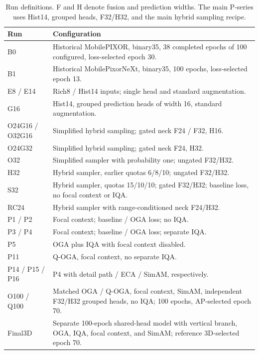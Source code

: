 \documentclass[10pt]{article}
\begin{document}
\begin{table}[htbp]
\centering\small
\caption{Run definitions. F and H denote fusion and prediction widths. The main P-series uses Hist14, grouped heads, F32/H32, and the main hybrid sampling recipe.}
\label{tab:designs}
\begin{tabular}{lp{12.1cm}}
\toprule Run & Configuration \\
\midrule
B0 & Historical MobilePIXOR, binary35, 38 completed epochs of 100 configured, loss-selected epoch 30. \\
B1 & Historical MobilePixorNeXt, binary35, 100 epochs, loss-selected epoch 13. \\
E8 / E14 & Rich8 / Hist14 inputs; single head and standard augmentation. \\
G16 & Hist14, grouped prediction heads of width 16, standard augmentation. \\
O24G16 / O32G16 & Simplified hybrid sampling; gated neck F24 / F32, H16. \\
O24G32 & Simplified hybrid sampling; gated neck F24, H32. \\
O32 & Simplified sampler with probability one; ungated F32/H32. \\
H32 & Hybrid sampler, earlier quotas 6/8/10; ungated F32/H32. \\
S32 & Hybrid sampler, quotas 15/10/10; gated F32/H32; baseline loss, no focal context or IQA. \\
RC24 & Hybrid sampler with range-conditioned neck F24/H32. \\
P1 / P2 & Focal context; baseline / OGA loss; no IQA. \\
P3 / P4 & Focal context; baseline / OGA loss; separate IQA. \\
P5 & OGA plus IQA with focal context disabled. \\
P11 & Q-OGA, focal context, no separate IQA. \\
P14 / P15 / P16 & P4 with detail path / ECA / SimAM, respectively. \\
O100 / Q100 & Matched OGA / Q-OGA, focal context, SimAM, independent F32/H32 grouped heads, no IQA; 100 epochs, AP-selected epoch 70. \\
Final3D & Separate 100-epoch shared-head model with vertical branch, OGA, IQA, focal context, and SimAM; reference 3D-selected epoch 70. \\
\bottomrule
\end{tabular}
\end{table}

\begin{table}[htbp]
\centering\scriptsize\setlength{\tabcolsep}{3pt}
\caption{All 23 local BEV R40 run scores (\%), including the new O100/Q100 pair. E/M/H mean Easy/Moderate/Hard; mAP M is the macro-average across the three Moderate class values. O100/Q100 complete 100 epochs; B0/B1 have historical budgets and loss selection; other runs complete 50 epochs.}
\label{tab:allap}

\end{table}
\end{document}

